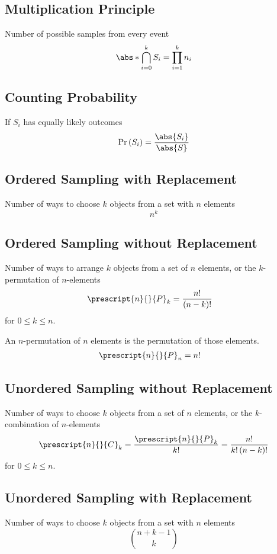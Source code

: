 \documentclass{article}
\begin{document}
\begin{multicols}{3}
    \subsection{Multiplication Principle}
    Number of possible samples from every event
    \begin{equation*}
        \abs*{\bigcap_{i=0}^{k} S_i} = \prod_{i = 1}^k n_i
    \end{equation*}
    \subsection{Counting Probability}
    If \(S_i\) has equally likely outcomes
    \begin{equation*}
        \Pr{\left( S_i \right)} = \frac{\abs{S_i}}{\abs{S}}
    \end{equation*}
    \subsection{Ordered Sampling with Replacement}
    Number of ways to choose \(k\) objects from a set with \(n\) elements
    \begin{equation*}
        n^k
    \end{equation*}
    \subsection{Ordered Sampling without Replacement}
    Number of ways to arrange \(k\) objects from a set of \(n\) elements,
    or the \(k\)-permutation of \(n\)-elements
    \begin{align*}
        \prescript{n}{}{P}_k & = \frac{n!}{\left( n - k \right)!}
    \end{align*}
    for \(0 \leq k \leq n\).

    An \(n\)-permutation of \(n\) elements is the permutation of those elements.
    \begin{align*}
        \prescript{n}{}{P}_n & = n!
    \end{align*}
    \subsection{Unordered Sampling without Replacement}
    Number of ways to choose \(k\) objects from a set of \(n\) elements,
    or the \(k\)-combination of \(n\)-elements
    \begin{align*}
        \prescript{n}{}{C}_k = \frac{\prescript{n}{}{P}_k}{k!} = \frac{n!}{k! \left( n - k \right)!}
    \end{align*}
    for \(0 \leq k \leq n\).
    \subsection{Unordered Sampling with Replacement}
    Number of ways to choose \(k\) objects from a set with \(n\) elements
    \begin{equation*}
        \binom{n + k - 1}{k}
    \end{equation*}
\end{multicols}
\end{document}
